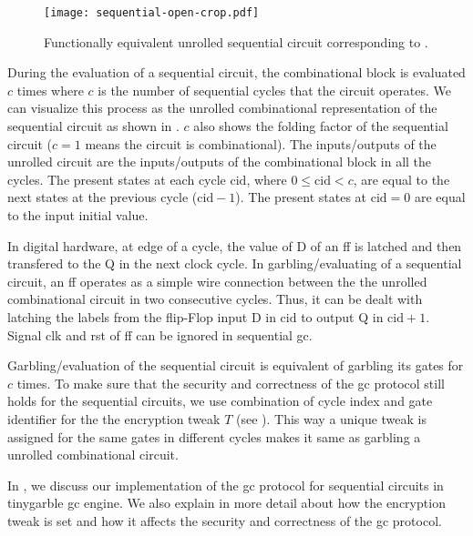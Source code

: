 \begin{figure}[h]
  \centering
  \texttt{[image: sequential-open-crop.pdf]}
  \caption{Functionally equivalent unrolled sequential circuit corresponding to .}
  \label{fig:open-sequential}
\end{figure}

During the evaluation of a sequential circuit, the combinational block is evaluated $c$ times where $c$ is the number of sequential cycles that the circuit operates.
We can visualize this process as the unrolled combinational representation of the sequential circuit as shown in .
$c$ also shows the folding factor of the sequential circuit ($c=1$ means the circuit is combinational).
The inputs/outputs of the unrolled circuit are the inputs/outputs of the combinational block in all the cycles.
The present states at each cycle $\textrm{cid}$, where $0 \le \textrm{cid} < c$, are equal to the next states at the previous cycle ($\textrm{cid}-1$).
The present states at $\textrm{cid}=0$ are equal to the input initial value.

In digital hardware, at edge of a cycle, the value of D of an \acrshort{ff} is latched and then transfered to the Q in the next clock cycle.
In garbling/evaluating of a sequential circuit, an \acrshort{ff} operates as a simple wire connection between the the unrolled combinational circuit in two consecutive cycles.
Thus, it can be dealt with latching the labels from the flip-Flop input D in $\textrm{cid}$ to output Q in $\textrm{cid}+1$.
Signal clk and rst of \acrshort{ff} can be ignored in sequential \acrshort{gc}.

Garbling/evaluation of the sequential circuit is equivalent of garbling its gates for $c$ times.
To make sure that the security and correctness of the \acrshort{gc} protocol still holds for the sequential circuits, we use combination of cycle index and gate identifier for the the encryption tweak $T$ (see ).
This way a unique tweak is assigned for the same gates in different cycles makes it same as garbling a unrolled combinational circuit.

In , we discuss our implementation of the \acrshort{gc} protocol for sequential circuits in \gls{tinygarble} \acrshort{gc} engine.
We also explain in more detail about how the encryption tweak is set and how it affects the security and correctness of the \acrshort{gc} protocol.

